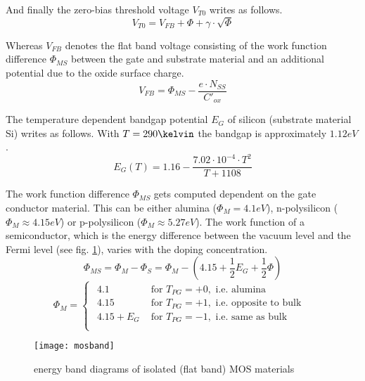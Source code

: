 And finally the zero-bias threshold voltage $V_{T0}$ writes as
follows.
\begin{equation}
V_{T0} = V_{FB} + \Phi + \gamma\cdot\sqrt{\Phi}
\end{equation}

Whereas $V_{FB}$ denotes the flat band voltage consisting of the work
function difference $\Phi_{MS}$ between the gate and substrate
material and an additional potential due to the oxide surface charge.
\begin{equation}
V_{FB} = \Phi_{MS} - \dfrac{e\cdot N_{SS}}{C'_{ox}}
\end{equation}

The temperature dependent bandgap potential $E_{G}$ of silicon
(substrate material Si) writes as follows.  With $T = 290\kelvin$ the
bandgap is approximately $1.12eV$.
\begin{equation}
E_{G}\left(T\right) = 1.16 - \dfrac{7.02\cdot 10^{-4}\cdot T^2}{T + 1108}
\end{equation}

The work function difference $\Phi_{MS}$ gets computed dependent on
the gate conductor material.  This can be either alumina ($\Phi_{M} =
4.1eV$), n-polysilicon ($\Phi_{M} \approx 4.15eV$) or p-polysilicon
($\Phi_{M} \approx 5.27eV$).  The work function of a semiconductor,
which is the energy difference between the vacuum level and the Fermi
level (see fig. \ref{fig:mosband}), varies with the doping
concentration.
\begin{equation}
\Phi_{MS} = \Phi_{M} - \Phi_{S} = \Phi_{M} - \left(4.15 + \dfrac{1}{2}E_{G} + \dfrac{1}{2}\Phi\right)
\label{eq:workfunction}
\end{equation}
\begin{equation}
\Phi_{M} =
\begin{cases}
\begin{array}{ll}
4.1 & \textrm{ for } T_{PG} = +0, \textrm{ i.e. alumina}\\
4.15 & \textrm{ for } T_{PG} = +1, \textrm{ i.e. opposite to bulk }\\
4.15 + E_{G} & \textrm{ for } T_{PG} = -1, \textrm{ i.e. same as bulk }\\
\end{array}
\end{cases}
\end{equation}

\begin{figure}[ht]
\begin{center}
\texttt{[image: mosband]}
\end{center}
\caption{energy band diagrams of isolated (flat band) MOS materials}
\label{fig:mosband}
\end{figure}
\FloatBarrier

